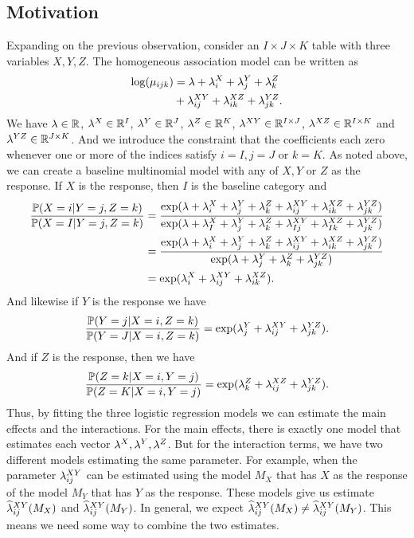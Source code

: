 \subsection{Motivation}
Expanding on the previous observation, consider an $I \times J \times K$ table with three variables $X,Y,Z$. The homogeneous association model can be written as 
\begin{align*}
    \log(\mu_{ijk}) &= \lambda + \lambda^X_i+\lambda^Y_j+\lambda^Z_k\\
    &+\lambda^{XY}_{ij}+\lambda^{XZ}_{ik}+\lambda^{YZ}_{jk}.
\end{align*}
We have $\lambda \in {\mathbb R}$, $\lambda^X\in {\mathbb R}^I$, $\lambda^Y \in {\mathbb R}^J$, $\lambda^Z \in {\mathbb R}^K$, $\lambda^{XY} \in {\mathbb R}^{I \times J}$, $\lambda^{XZ} \in {\mathbb R}^{I \times K}$ and $\lambda^{YZ} \in {\mathbb R}^{J \times K}$. And we introduce the constraint that the coefficients each zero whenever one or more of the indices satisfy $i=I,j=J$ or $k=K$. As noted above, we can create a baseline multinomial model with any of $X,Y$ or $Z$ as the response. If $X$ is the response, then $I$ is the baseline category and
\begin{align*}
    \frac{{\mathbb{P}}(X=i|Y=j,Z=k)}{{\mathbb{P}}(X=I|Y=j,Z=k)} &=\frac{\exp(\lambda + \lambda^X_i + \lambda^Y_j+\lambda^Z_k + \lambda^{XY}_{ij}+\lambda^{XZ}_{ik}+\lambda^{YZ}_{jk})}{\exp(\lambda + \lambda^X_I + \lambda^Y_j+\lambda^Z_k + \lambda^{XY}_{Ij}+\lambda^{XZ}_{Ik}+\lambda^{YZ}_{jk})}\\
    &=\frac{\exp(\lambda + \lambda^X_i + \lambda^Y_j+\lambda^Z_k + \lambda^{XY}_{ij}+\lambda^{XZ}_{ik}+\lambda^{YZ}_{jk})}{\exp(\lambda + \lambda^Y_j+\lambda^Z_k+\lambda^{YZ}_{jk})}\\
    &=\exp(\lambda^X_i+\lambda^{XY}_{ij}+\lambda^{XZ}_{ik}).
\end{align*}
And likewise if $Y$ is the response we have 
\begin{align*}
    \frac{{\mathbb{P}}(Y=j|X=i,Z=k)}{{\mathbb{P}}(Y=J|X=i,Z=k)} = \exp(\lambda^Y_j+\lambda^{XY}_{ij}+\lambda^{YZ}_{jk}).
\end{align*}
And if $Z$ is the response, then we have 
\begin{align*}
    \frac{{\mathbb{P}}(Z=k|X=i,Y=j)}{{\mathbb{P}}(Z=K|X=i,Y=j)} = \exp(\lambda^Z_k+\lambda^{XZ}_{ij}+\lambda^{YZ}_{jk}).
\end{align*}
Thus, by fitting the three logistic regression models we can estimate the main effects and the interactions. For the main effects, there is exactly one model that estimates each vector $\lambda^X,\lambda^Y,\lambda^Z$. But for the interaction terms, we have two different models estimating the same parameter. For example, when the parameter $\lambda^{XY}_{ij}$ can be estimated using the model $M_X$ that has $X$ as the response of the model $M_Y$ that has $Y$ as the response. These models give us estimate $\widehat{\lambda}^{XY}_{ij}(M_X)$ and $\widehat{\lambda}^{XY}_{ij}(M_Y)$. In general, we expect $\widehat{\lambda}^{XY}_{ij}(M_X)\neq \widehat{\lambda}^{XY}_{ij}(M_Y)$. This means we need some way to combine the two estimates. 
